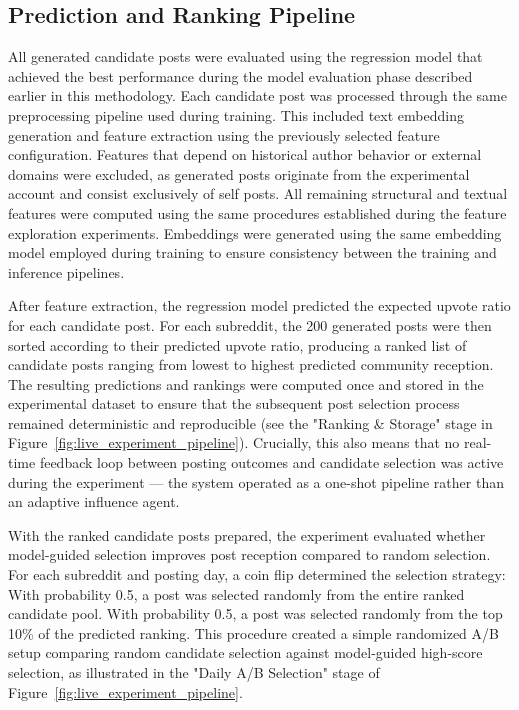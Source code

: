 \subsection{Prediction and Ranking Pipeline}
All generated candidate posts were evaluated using the regression model that achieved the best performance during the model evaluation phase described earlier in this methodology. 
Each candidate post was processed through the same preprocessing pipeline used during training. 
This included text embedding generation and feature extraction using the previously selected feature configuration. 
Features that depend on historical author behavior or external domains were excluded, as generated posts originate from the experimental account and consist exclusively of self posts. 
All remaining structural and textual features were computed using the same procedures established during the feature exploration experiments. 
Embeddings were generated using the same embedding model employed during training to ensure consistency between the training and inference pipelines. 

After feature extraction, the regression model predicted the expected upvote ratio for each candidate post. 
For each subreddit, the 200 generated posts were then sorted according to their predicted upvote ratio, producing a ranked list of candidate posts ranging from lowest to highest predicted community reception.
The resulting predictions and rankings were computed once and stored in the experimental dataset to ensure that the subsequent post selection process remained deterministic and reproducible (see the "Ranking \& Storage" stage in Figure~\ref{fig:live_experiment_pipeline}). 
Crucially, this also means that no real-time feedback loop between posting outcomes and candidate selection was active during the experiment — the system operated as a one-shot pipeline rather than an adaptive influence agent.

With the ranked candidate posts prepared, the experiment evaluated whether model-guided selection improves post reception compared to random selection.
For each subreddit and posting day, a coin flip determined the selection strategy: With probability 0.5, a post was selected randomly from the entire ranked candidate pool. 
With probability 0.5, a post was selected randomly from the top 10\% of the predicted ranking.
This procedure created a simple randomized A/B setup comparing random candidate selection against model-guided high-score selection, as illustrated in the "Daily A/B Selection" stage of Figure~\ref{fig:live_experiment_pipeline}.

